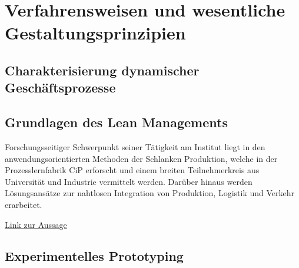 \section{Verfahrensweisen und wesentliche Gestaltungsprinzipien}

\subsection{Charakterisierung dynamischer Geschäftsprozesse}

\subsection{Grundlagen des Lean Managements}
Forschungsseitiger Schwerpunkt seiner Tätigkeit am Institut liegt in den anwendungsorientierten Methoden der Schlanken Produktion, welche in der Prozesslernfabrik CiP erforscht und einem breiten Teilnehmerkreis aus Universität und Industrie vermittelt werden. Darüber hinaus werden Lösungsansätze zur nahtlosen Integration von Produktion, Logistik und Verkehr erarbeitet.

\hyperlink{https://www.ptw.tu-darmstadt.de/landingpage_ptw/das_ptw_1/geschichte_ptw_1/index.de.jsp}{Link zur Aussage}
\subsection{Experimentelles Prototyping}
